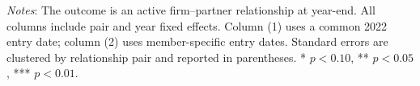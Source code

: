 \begin{table}[H]
\centering
\caption{Baseline results}
\label{tab:baseline}
\small
\begin{threeparttable}
\begin{tablenotes}[flushleft]
\item
\footnotesize \textit{Notes}: The outcome is an active firm--partner relationship at year-end. All columns include pair and year fixed effects. Column (1) uses a common 2022 entry date; column (2) uses member-specific entry dates. Standard errors are clustered by relationship pair and reported in parentheses. * $p<0.10$, ** $p<0.05$, *** $p<0.01$.
\end{tablenotes}
\end{threeparttable}
\end{table}
